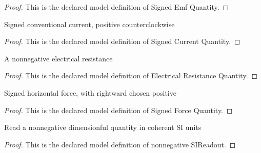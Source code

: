 \begin{proof}
  This is the declared model definition of Signed Emf Quantity.
\end{proof}
\begin{definition}
  \label{def:physics:phyx-mini-0977:phyxminiproblems-problemphyxmini0977-signedcurrentquantity}
  Signed conventional current, positive counterclockwise
\end{definition}
\begin{proof}
  This is the declared model definition of Signed Current Quantity.
\end{proof}
\begin{definition}
  \label{def:physics:phyx-mini-0977:phyxminiproblems-problemphyxmini0977-electricalresistancequantity}
  A nonnegative electrical resistance
\end{definition}
\begin{proof}
  This is the declared model definition of Electrical Resistance Quantity.
\end{proof}
\begin{definition}
  \label{def:physics:phyx-mini-0977:phyxminiproblems-problemphyxmini0977-signedforcequantity}
  Signed horizontal force, with rightward chosen positive
\end{definition}
\begin{proof}
  This is the declared model definition of Signed Force Quantity.
\end{proof}
\begin{definition}
  \label{def:physics:phyx-mini-0977:phyxminiproblems-problemphyxmini0977-nonnegativesireadout}
  Read a nonnegative dimensionful quantity in coherent SI units
\end{definition}
\begin{proof}
  This is the declared model definition of nonnegative SIReadout.
\end{proof}
